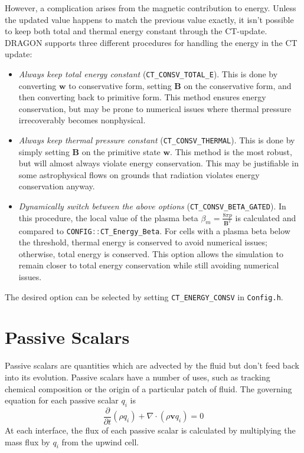 \documentclass[11pt]{report}
\newcommand{\pd}[2]{\frac{\partial #1}{\partial #2}}
\newcommand{\cpp}[1]{\lstinline[language=C++]{#1}}
\newcommand{\bash}[1]{\lstinline[language=bash]{#1}}
\begin{document}
However, a complication arises from the magnetic contribution to energy.  Unless the updated value happens to match the previous value exactly, it isn't possible to keep both total and thermal energy constant through the CT-update. 
DRAGON supports three different procedures for handling the energy in the CT update: 
\begin{itemize}
\item \textit{Always keep total energy constant} (\cpp{CT_CONSV_TOTAL_E}). This is done by converting $\mathbf{w}$ to conservative form, setting $\mathbf{B} $ on the conservative form, and then converting back to primitive form. This method ensures energy conservation, but may be prone to numerical issues where thermal pressure irrecoverably becomes nonphysical.
\item \textit{Always keep thermal pressure constant} (\cpp{CT_CONSV_THERMAL}). This is done by simply setting $\mathbf{B}$ on the primitive state $\mathbf{w}$. This method is the most robust, but will almost always violate energy conservation. This may be justifiable in some astrophysical flows on grounds that radiation violates energy conservation anyway.
\item \textit{Dynamically switch between the above options} (\cpp{CT_CONSV_BETA_GATED}). In this procedure, the local value of the plasma beta $\beta_m = \frac{8\pi p}{\mathbf{B}^2}$ is calculated and compared to \cpp{CONFIG::CT_Energy_Beta}. For cells with a plasma beta below the threshold, thermal energy is conserved to avoid numerical issues; otherwise, total energy is conserved. This option allows the simulation to remain closer to total energy conservation while still avoiding numerical issues. 
\end{itemize}
The desired option can be selected by setting \cpp{CT_ENERGY_CONSV} in \bash{Config.h}.


\section{Passive Scalars} \label{sec:passive}

Passive scalars are quantities which are advected by the fluid but don't feed back into its evolution. Passive scalars have a number of uses, such as tracking chemical composition or the origin of a particular patch of fluid.
 The governing equation for each passive scalar $q_i$ is
\begin{equation} \pd{}{t}(\rho q_i)+ \nabla\cdot (\rho \mathbf{v} q_i) = 0 \end{equation}
At each interface, the flux of each passive scalar is calculated by multiplying the mass flux by $q_i$ from the upwind cell.
\end{document}
